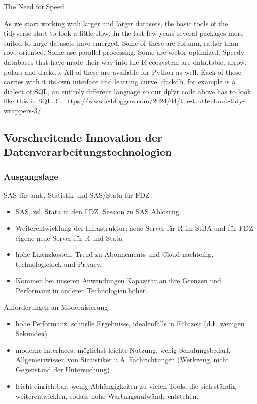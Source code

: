 \documentclass[
  german,
  10pt,
  twoside]{article}
\providecommand{\tightlist}{%
  \setlength{\itemsep}{0pt}\setlength{\parskip}{0pt}}
\begin{document}
The Need for Speed

As we start working with larger and larger datasets, the basic tools of
the tidyverse start to look a little slow. In the last few years several
packages more suited to large datasets have emerged. Some of these are
column, rather than row, oriented. Some use parallel processing. Some
are vector optimized. Speedy databases that have made their way into the
R ecosystem are data.table, arrow, polars and duckdb. All of these are
available for Python as well. Each of these carries with it its own
interface and learning curve. duckdb, for example is a dialect of SQL,
an entirely different language so our dplyr code above has to look like
this in SQL: S.
https://www.r-bloggers.com/2024/04/the-truth-about-tidy-wrappers-3/

\subsection{Vorschreitende Innovation der
Datenverarbeitungstechnologien}\label{vorschreitende-innovation-der-datenverarbeitungstechnologien}

\subsubsection{Ausgangslage}\label{ausgangslage}

SAS für amtl. Statistik und SAS/Stata für FDZ

\begin{itemize}
\tightlist
\item
  SAS, zsl. Stata in den FDZ. Session zu SAS Ablösung
\item
  Weiterentwicklung der Infrastruktur: neue Server für R im StBA und für
  FDZ eigene neue Server für R und Stata
\item
  hohe Lizenzkosten, Trend zu Abonnements und Cloud nachteilig,
  technologielock und Privacy.
\item
  Kommen bei unseren Anwendungen Kapazitär an ihre Grenzen und
  Performanz in anderen Technologien höher.
\end{itemize}

Anforderungen an Modernisierung

\begin{itemize}
\tightlist
\item
  hohe Performanz, schnelle Ergebnisse, idealenfalls in Echtzeit (d.h.
  wenigen Sekunden)
\item
  moderne Interfaces, möglichst leichte Nutzung, wenig Schulungsbedarf,
  Allgemeinwissen von Statistiker u.Ä. Fachrichtungen (Werkzeug, nicht
  Gegenstand der Untersuchung)
\item
  leicht einrichtbar, wenig Abhängigkeiten zu vielen Tools, die sich
  ständig weiterentwicklen, sodass hohe Wartungsaufwände entstehen.
\end{itemize}
\end{document}
